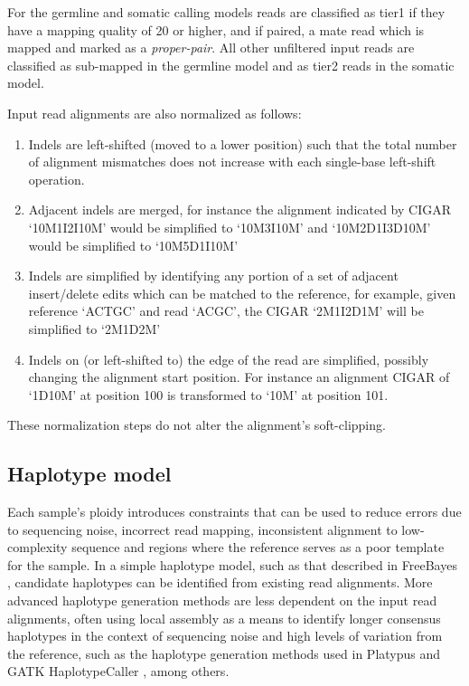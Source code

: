 \documentclass{article}
\begin{document}
For the germline and somatic calling models reads are classified as tier1 if they have a mapping quality of 20 or higher, and if paired, a mate read which is mapped and marked as a \emph{proper-pair}. All other unfiltered input reads are classified as sub-mapped in the germline model and as tier2 reads in the somatic model.

Input read alignments are also normalized as follows:
\begin{enumerate}
    \item Indels are left-shifted (moved to a lower position) such that the total number of alignment mismatches does not increase with each single-base left-shift operation.
    \item Adjacent indels are merged, for instance the alignment indicated by CIGAR `10M1I2I10M' would be simplified to `10M3I10M' and `10M2D1I3D10M' would be simplified to `10M5D1I10M'
    \item Indels are simplified by identifying any portion of a set of adjacent insert/delete edits which can be matched to the reference, for example, given reference `ACTGC' and read `ACGC', the CIGAR `2M1I2D1M' will be simplified to `2M1D2M'
    \item Indels on (or left-shifted to) the edge of the read are simplified, possibly changing the alignment start position. For instance an alignment CIGAR of `1D10M' at position 100 is transformed to `10M' at position 101.
\end{enumerate}
These normalization steps do not alter the alignment's soft-clipping.

\subsection{Haplotype model}

Each sample's ploidy introduces constraints that can be used to reduce errors due to sequencing noise, incorrect read mapping, inconsistent alignment to low-complexity sequence and regions where the reference serves as a poor template for the sample. In a simple haplotype model, such as that described in FreeBayes \cite{garrison2012}, candidate haplotypes can be identified from existing read alignments. More advanced haplotype generation methods are less dependent on the input read alignments, often using local assembly as a means to identify longer consensus haplotypes in the context of sequencing noise and high levels of variation from the reference, such as the haplotype generation methods used in Platypus \cite{rimmer2014} and GATK HaplotypeCaller \cite{depristo2011}, among others.
\end{document}
